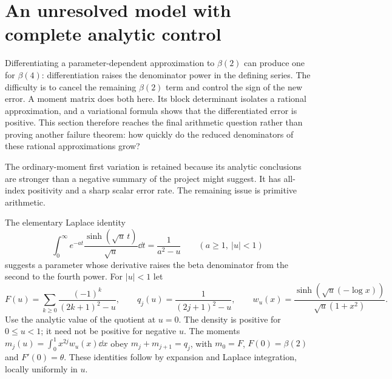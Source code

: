 \section{An unresolved model with complete analytic control}\label{sec:variation}
Differentiating a parameter-dependent approximation to $\beta(2)$ can
produce one for $\beta(4)$: differentiation raises the denominator
power in the defining series. The difficulty is to cancel the remaining
$\beta(2)$ term and control the sign of the new error. A moment matrix
does both here. Its block determinant isolates a rational approximation,
and a variational formula shows that the differentiated error is positive.
This section therefore reaches the final arithmetic question rather
than proving another failure theorem: how quickly do the reduced
denominators of these rational approximations grow?

The ordinary-moment first variation  is retained because
its analytic conclusions are stronger than a negative summary of the
project might suggest. It has all-index positivity and a sharp scalar
error rate. The remaining issue is primitive arithmetic.

The elementary Laplace identity
\[
 \int_0^\infty e^{-at}\frac{\sinh(\sqrt u\,t)}{\sqrt u}\dd t
       =\frac1{a^2-u}\qquad(a\geq1,\ |u|<1)
\]
suggests a parameter whose derivative raises the beta denominator
from the second to the fourth power. For $|u|<1$ let
\[
 F(u)=\sum_{k\geq0}\frac{(-1)^k}{(2k+1)^2-u},\qquad
 q_j(u)=\frac1{(2j+1)^2-u},\qquad
 w_u(x)=\frac{\sinh(\sqrt u(-\log x))}{\sqrt u(1+x^2)}.
\]
Use the analytic value of the quotient at $u=0$. The density is positive
for $0\leq u<1$; it need not be positive for negative $u$.
The moments $m_j(u)=\int_0^1x^{2j}w_u(x)\dd x$ obey
$m_j+m_{j+1}=q_j$, with $m_0=F$, $F(0)=\beta(2)$ and $F'(0)=\theta$.
These identities follow by expansion and Laplace integration, locally
uniformly in $u$.

